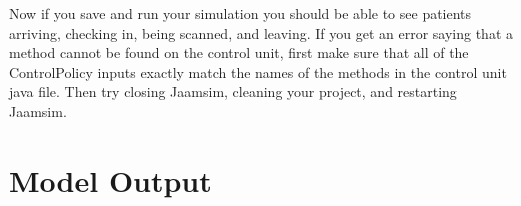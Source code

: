 \documentclass[
  10pt,
  a4paperpaper,
  DIV=11,
  numbers=noendperiod,
  oneside]{scrreprt}
\begin{document}
\begin{table}

\caption{\label{tbl-wait_params}Wait Activity Parameters}


\end{table}%

Now if you save and run your simulation you should be able to see
patients arriving, checking in, being scanned, and leaving. If you get
an error saying that a method cannot be found on the control unit, first
make sure that all of the ControlPolicy inputs exactly match the names
of the methods in the control unit java file. Then try closing Jaamsim,
cleaning your project, and restarting Jaamsim.

\section{Model Output}\label{model-output}
\end{document}
